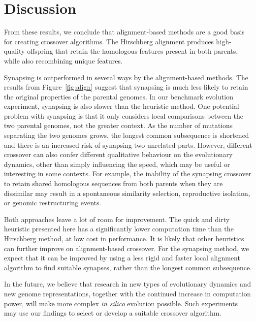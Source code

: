 \documentclass[10pt]{article}
\begin{document}
\section{Discussion}
From these results, we conclude that alignment-based methods are a good basis
for creating crossover algorithms. The Hirschberg alignment produces high-quality
offspring that retain the homologous features present in both parents, while also recombining
unique features.

Synapsing is outperformed in several ways by the alignment-based methods. The results
from Figure~\ref{fig:align} suggest that synapsing is much less likely to retain the
original properties of the parental genomes. In our benchmark evolution experiment,
synapsing is also slower than the heuristic method. One potential problem
with synapsing is that it only considers local comparisons between the two parental
genomes, not the greater context. As the number of mutations separating the two
genomes grows, the longest common subsequence is shortened and there is an increased
risk of synapsing two unrelated parts. However, different crossover can also confer different
qualitative behaviour on the evolutionary dynamics, other than simply influencing the speed,
which may be useful or interesting in some contexts.
For example, the inability of the synapsing crossover to retain shared homologous sequences
from both parents when they are dissimilar may result in a spontaneous similarity
selection, reproductive isolation, or genomic restructuring events.

Both approaches leave a lot of room for improvement. The quick and dirty
heuristic presented here has a significantly lower computation time than the Hirschberg
method, at low cost in performance. It is likely that other heuristics can further
improve on alignment-based crossover. For the synapsing method, we expect that it can be
improved by using a less rigid and faster local alignment algorithm to find
suitable synapses, rather than the longest common subsequence.

In the future, we believe that research in new types of evolutionary dynamics and
new genome representations, together with the continued increase in computation power,
will make more complex \textit{in silico} evolution possible. Such
experiments may use our findings to select or develop a suitable
crossover algorithm.


\end{document}
